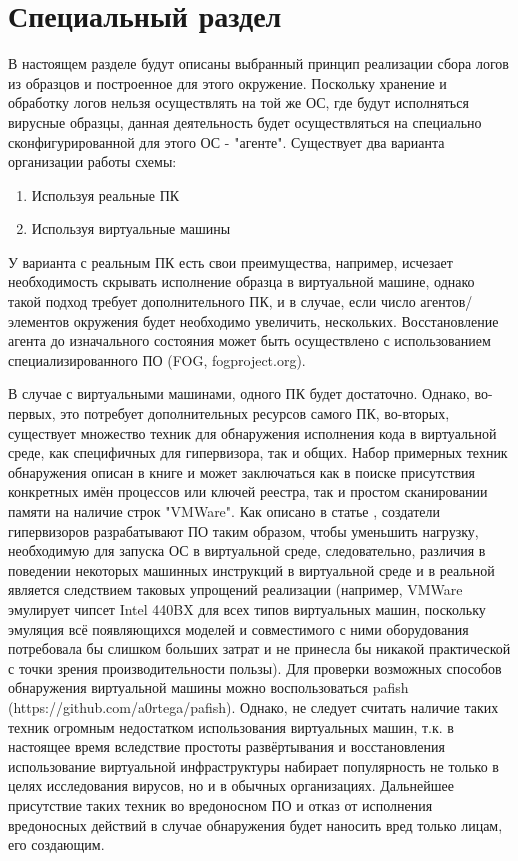 \section {Специальный раздел}
В настоящем разделе будут описаны выбранный принцип реализации сбора логов из образцов и построенное для этого окружение. Поскольку хранение и обработку логов нельзя осуществлять на той же ОС, где будут исполняться вирусные образцы, данная деятельность будет осуществляться на специально сконфигурированной для этого ОС - "агенте". Существует два варианта организации работы схемы:
\begin {enumerate}
	\item Используя реальные ПК
	\item Используя виртуальные машины
\end {enumerate}
У варианта с реальным ПК есть свои преимущества, например, исчезает необходимость скрывать исполнение
образца в виртуальной машине, однако такой подход требует дополнительного ПК, и в случае,
если число агентов/ элементов окружения будет необходимо увеличить, нескольких. Восстановление агента
до изначального состояния может быть осуществлено с использованием специализированного ПО (FOG, fogproject.org).

В случае с виртуальными машинами, одного ПК будет достаточно. Однако, во-первых, это потребует дополнительных ресурсов самого ПК, во-вторых, существует множество техник для обнаружения исполнения кода в виртуальной среде, как специфичных для гипервизора, так и общих. Набор примерных техник обнаружения описан в  книге \cite{MALWAREANALYSIS} и может заключаться как в поиске присутствия конкретных имён процессов или ключей реестра, так и простом сканировании памяти на наличие строк "VMWare".  Как описано в статье \cite {VMMYTHS}, создатели гипервизоров разрабатывают ПО таким образом, чтобы уменьшить нагрузку,  необходимую для запуска ОС в виртуальной среде, следовательно, различия в поведении некоторых машинных инструкций в виртуальной среде и в реальной является следствием таковых упрощений реализации (например, VMWare эмулирует чипсет Intel 440BX для всех типов виртуальных машин, поскольку эмуляция всё появляющихся моделей и совместимого с ними оборудования потребовала бы слишком больших затрат и не принесла бы никакой практической с точки зрения производительности пользы). Для проверки возможных способов обнаружения виртуальной машины можно воспользоваться pafish (https://github.com/a0rtega/pafish). Однако, не следует считать наличие таких техник огромным недостатком использования виртуальных машин, т.к. в настоящее время вследствие простоты развёртывания и восстановления использование виртуальной инфраструктуры набирает популярность не только в целях исследования вирусов, но и в обычных организациях. Дальнейшее присутствие таких техник во вредоносном ПО и отказ от исполнения вредоносных действий в случае обнаружения будет наносить вред только лицам, его создающим.

